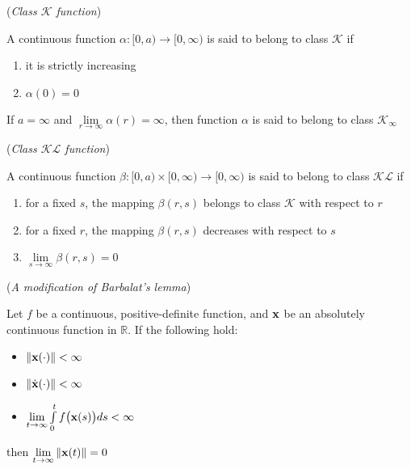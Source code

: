 \begin{bw_box}
\begin{definition}\cite{khalil_nonlinear_systems} (\textit{Class $\mathcal{K}$ function})
\label{def:k_class}

  A continuous function $\alpha : [0, a) \to [0, \infty)$
  is said to belong to class $\mathcal{K}$ if
  \begin{enumerate}
    \item it is strictly increasing
    \item $\alpha (0) = 0$
  \end{enumerate}
  If $a = \infty$ and $\lim\limits_{r \to \infty} \alpha(r) = \infty$, then function
  $\alpha$ is said to belong to class $\mathcal{K}_{\infty}$
\end{definition}
\end{bw_box}

\begin{bw_box}
\begin{definition}\cite{khalil_nonlinear_systems} (\textit{Class $\mathcal{KL}$ function})
\label{def:kl_class}

  A continuous function $\beta : [0, a) \times [0, \infty) \to [0, \infty)$
  is said to belong to class $\mathcal{KL}$ if
  \begin{enumerate}
    \item for a fixed $s$, the mapping $\beta(r,s)$ belongs to class $\mathcal{K}$ with respect to $r$
    \item for a fixed $r$, the mapping $\beta(r,s)$ decreases with respect to $s$
    \item $\lim\limits_{s \to \infty} \beta(r,s) = 0$
  \end{enumerate}
\end{definition}
\end{bw_box}

\begin{bw_box}
  \begin{lemma} \cite{Fontes2007} (\textit{A modification of Barbalat's lemma})
  \label{lemma:barbalat}

    Let $f$ be a continuous, positive-definite function, and $\bm{\mathbf{x}}$ be an
    absolutely continuous function in $\mathbb{R}$. If the following hold:
  \begin{itemize}
    \item $\|\bm{\mathbf{x}}(\cdot)\| < \infty$
    \item $\|\dot{\bm{\mathbf{x}}}(\cdot)\| < \infty$
    \item $\lim\limits_{t \to \infty} \int\limits_0^t f\big(\bm{\mathbf{x}}(s)\big)ds < \infty$
  \end{itemize}
  then $\lim\limits_{t \to \infty} \|\bm{\mathbf{x}}(t)\| = 0$
  \end{lemma}
\end{bw_box}


